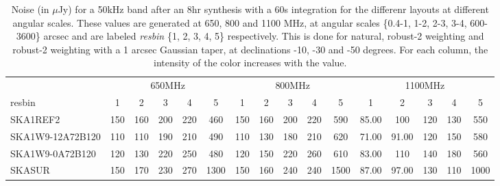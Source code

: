 \begin{table}[!htp]
{{\begin{tabular}{|lccccc||ccccc||ccccc|}
 \tabularnewline \cline{2-16} \multicolumn{1}{c}{ } & \multicolumn{5}{|c}{650MHz}  & \multicolumn{5}{c}{800MHz}  & \multicolumn{5}{c|}{1100MHz} \tabularnewline \cline{1-16} 
 resbin  &1 & 2 & 3 & 4 & 5 & 1 & 2 & 3 & 4 & 5 & 1 & 2 & 3 & 4 & 5 \tabularnewline \hline
SKA1REF2 & 150 \cellcolor{blue!60.00} & 160 \cellcolor{red!53.00} & 200 \cellcolor{green!28.50} & 220 \cellcolor{orange!25.00} & 460 \cellcolor{purple!18.00} & 150 \cellcolor{blue!60.00} & 160 \cellcolor{red!60.00} & 200 \cellcolor{green!32.00} & 220 \cellcolor{orange!26.40} & 590 \cellcolor{purple!18.00} & 85.00 \cellcolor{blue!54.75} & 100 \cellcolor{red!37.89} & 120 \cellcolor{green!18.00} & 130 \cellcolor{orange!30.00} & 550 \cellcolor{purple!18.00}\\ \hline 
SKA1W9-12A72B120 & 110 \cellcolor{blue!18.00} & 110 \cellcolor{red!18.00} & 190 \cellcolor{green!18.00} & 210 \cellcolor{orange!18.00} & 490 \cellcolor{purple!19.50} & 110 \cellcolor{blue!18.00} & 130 \cellcolor{red!18.00} & 180 \cellcolor{green!18.00} & 210 \cellcolor{orange!18.00} & 620 \cellcolor{purple!19.38} & 71.00 \cellcolor{blue!18.00} & 91.00 \cellcolor{red!18.00} & 120 \cellcolor{green!18.00} & 150 \cellcolor{orange!42.00} & 580 \cellcolor{purple!20.80}\\ \hline 
SKA1W9-0A72B120 & 120 \cellcolor{blue!28.50} & 130 \cellcolor{red!32.00} & 220 \cellcolor{green!49.50} & 250 \cellcolor{orange!46.00} & 480 \cellcolor{purple!19.00} & 120 \cellcolor{blue!28.50} & 150 \cellcolor{red!46.00} & 220 \cellcolor{green!46.00} & 260 \cellcolor{orange!60.00} & 610 \cellcolor{purple!18.92} & 83.00 \cellcolor{blue!49.50} & 110 \cellcolor{red!60.00} & 140 \cellcolor{green!60.00} & 180 \cellcolor{orange!60.00} & 560 \cellcolor{purple!18.93}\\ \hline 
SKASUR & 150 \cellcolor{blue!60.00} & 170 \cellcolor{red!60.00} & 230 \cellcolor{green!60.00} & 270 \cellcolor{orange!60.00} & 1300 \cellcolor{purple!60.00} & 150 \cellcolor{blue!60.00} & 160 \cellcolor{red!60.00} & 240 \cellcolor{green!60.00} & 240 \cellcolor{orange!43.20} & 1500 \cellcolor{purple!60.00} & 87.00 \cellcolor{blue!60.00} & 97.00 \cellcolor{red!31.26} & 130 \cellcolor{green!39.00} & 110 \cellcolor{orange!18.00} & 1000 \cellcolor{purple!60.00}\tabularnewline \hline 
\end{tabular}}\hfil 

\caption{Noise (in $\mu$Jy) for a 50kHz band after an 8hr synthesis with a 60s integration for the differenr layouts at different angular scales. These values are generated at 650, 800 and 1100 MHz, at angular scales \{0.4-1, 1-2, 2-3, 3-4, 600-3600\} arcsec and are labeled {\it resbin} \{1, 2, 3, 4, 5\} respectively. This is done for natural, robust-2 weighting and robust-2 weighting with a 1 arcsec Gaussian taper, at declinations -10, -30 and -50 degrees. For each column, the intensity of the color increases with the value.}\label{tab:noise50k-mix_sefd}}
 \end{table}